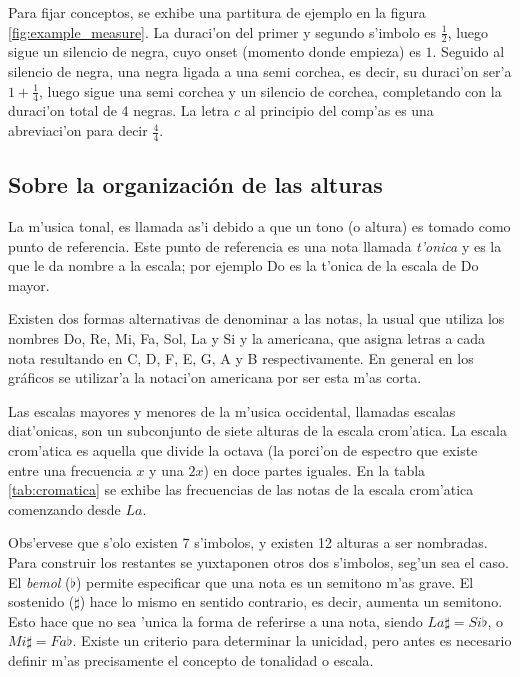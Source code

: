Para fijar conceptos, se exhibe una partitura de ejemplo en la figura \ref{fig:example_measure}. 
La duraci'on del primer y segundo s'imbolo es $\frac{1}{2}$,
luego sigue un silencio de negra, cuyo onset (momento donde empieza) es $1$. Seguido al silencio de negra, una negra ligada a una semi corchea, 
es decir, su duraci'on ser'a $1 + \frac{1}{4}$, 
luego sigue una semi corchea y un silencio de corchea, completando
con la duraci'on total de 4 negras. La letra $c$ al principio del comp'as es una abreviaci'on para decir $\frac{4}{4}$.

\begin{imagen}
    \width{12.5cm}
\end{imagen}

\subsection{Sobre la organizaci\'on de las alturas}
La m'usica tonal, es llamada as'i debido a que un tono (o altura) es tomado como punto de referencia.
Este punto de referencia es una nota llamada \emph{t'onica} y es la que le da nombre a la escala; por ejemplo Do es la t'onica de la escala de Do mayor. 

Existen dos formas alternativas de denominar a las notas, la usual que utiliza los nombres Do, Re, Mi, Fa, Sol, La y Si y la americana, que asigna
letras a cada nota resultando en C, D, F, E, G, A y B respectivamente. En general en los gr\'aficos se utilizar'a la notaci'on americana 
por ser esta m'as corta.

Las escalas mayores y menores de la m'usica occidental, llamadas escalas diat'onicas, son un subconjunto de siete alturas de la escala crom'atica.
La escala crom'atica es aquella que divide la octava (la porci'on de espectro que existe entre una frecuencia $x$ y una $2x$)
en doce partes iguales.
En la tabla \ref{tab:cromatica} se exhibe las frecuencias de las notas de la escala crom'atica comenzando desde $La$. 

Obs'ervese que s'olo existen 7 s'imbolos, y existen 12 alturas a ser nombradas. Para construir los restantes se yuxtaponen otros dos s'imbolos, 
seg'un sea el caso. 
El \emph{bemol} ($\flat$) permite especificar que una nota es un semitono m'as grave. El sostenido ($\sharp$) hace lo mismo en sentido contrario, 
es decir, aumenta un semitono.
Esto hace que no sea 'unica la forma de referirse a una nota, siendo $La\sharp = Si\flat$, o $Mi\sharp=Fa\flat$. Existe un criterio para determinar la 
unicidad, pero antes es necesario definir m'as precisamente el concepto de tonalidad o escala.


